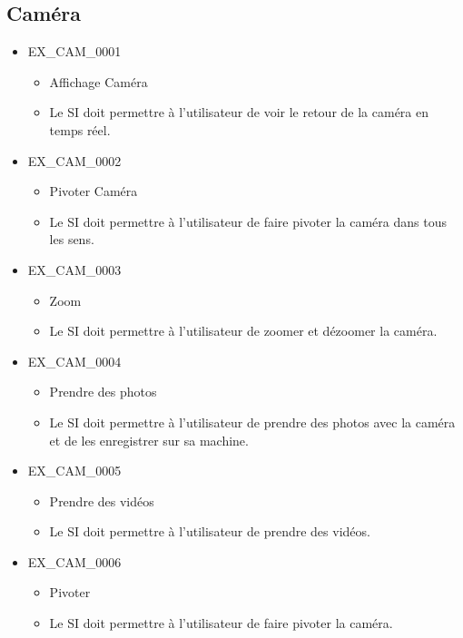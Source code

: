 \documentclass[12pt,a4paper]{scrartcl}
\begin{document}
\subsection{Caméra}

\begin{itemize}


\item EX\_CAM\_0001
\begin{itemize}
\item Affichage Caméra
\item Le SI doit permettre à l'utilisateur de voir le retour de la caméra en 
		temps réel.
\end{itemize}

\item EX\_CAM\_0002
\begin{itemize}
\item Pivoter Caméra
\item Le SI doit permettre à l'utilisateur de faire pivoter la caméra dans 
	tous les sens.
\end{itemize}

\item EX\_CAM\_0003
\begin{itemize}
\item Zoom
\item Le SI doit permettre à l'utilisateur de zoomer et dézoomer la caméra. 
\end{itemize}


\item EX\_CAM\_0004
\begin{itemize}
\item Prendre des photos
\item Le SI doit permettre à l'utilisateur de prendre des photos avec la caméra 			et de les enregistrer sur sa machine.
\end{itemize}

\item EX\_CAM\_0005
\begin{itemize}
\item Prendre des vidéos
\item Le SI doit permettre à l'utilisateur de prendre des vidéos.
\end{itemize}

\item EX\_CAM\_0006
\begin{itemize}
\item Pivoter
\item Le SI doit permettre à l'utilisateur de faire pivoter la caméra.
\end{itemize}


\end{itemize}
\end{document}
